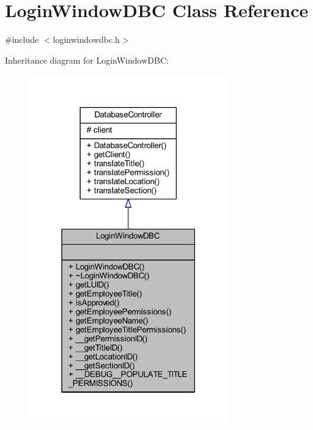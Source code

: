 \hypertarget{class_login_window_d_b_c}{}\section{Login\+Window\+D\+B\+C Class Reference}
\label{class_login_window_d_b_c}


{\ttfamily \#include $<$loginwindowdbc.\+h$>$}



Inheritance diagram for Login\+Window\+D\+B\+C\+:
\nopagebreak
\begin{figure}[H]
\begin{center}
\leavevmode
\includegraphics[width=243pt]{class_login_window_d_b_c__inherit__graph}
\end{center}
\end{figure}


